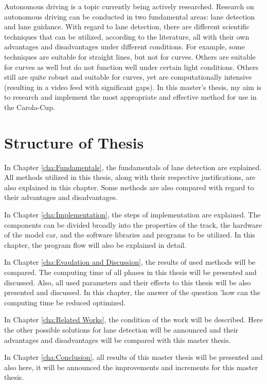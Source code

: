 Autonomous driving is a topic currently being actively researched. Research on 
autonomous driving can be conducted in two fundamental areas: lane detection and lane 
guidance. With regard to lane detection, there are different scientific techniques that 
can be utilized, according to the literature, all with their own advantages and 
disadvantages under different conditions. For example, some techniques are suitable for 
straight lines, but not for curves. Others are suitable for curves as well but do not 
function well under certain light conditions. Others still are quite robust and 
suitable for curves, yet are computationally intensive (resulting in a video feed with 
significant gaps). In this master's thesis, my aim is to research and implement the 
most appropriate and effective method for use in the Carola-Cup.

\section{Structure of Thesis}\label{sec:Structure of Thesis}


In Chapter \ref{cha:Fundamentals}, the fundamentals of lane detection are explained. All 
methods utilized in this thesis, along with their respective justifications, are also 
explained in this chapter. Some methods are also compared with regard to their 
advantages and disadvantages.


In Chapter \ref{cha:Implementation}, the steps of implementation are explained. The 
components can be divided broadly into the properties of the track, the hardware of the 
model car, and the software libraries and programs to be utilized. In this chapter, the 
program flow will also be explained in detail.

In Chapter \ref{cha:Evaulation and Discussion}, the results of used methods will be 
compared. The computing time of all phases in this thesis will be presented and discussed. 
Also, all used parameters and their effects to this thesis will be also presented and 
discussed. In this chapter, the answer of the question 'how can the computing time be reduced 
optimized.

In Chapter \ref{cha:Related Works}, the condition of the work will be described. Here the other 
possible solutions for lane detection will be announced and their advantages and disadvantages
will be compared with this master thesis.

In Chapter \ref{cha:Conclusion}, all results of this master thesis will be presented and also here, 
it will be announced the improvements and increments for this master thesis.


